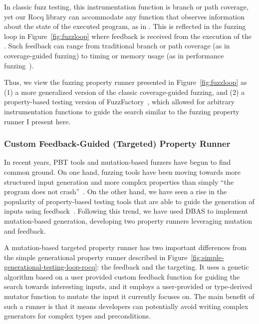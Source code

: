 In classic fuzz testing, this instrumentation function is branch or path coverage, yet
our Rocq library can accommodate any function that observes information about the state
of the executed program, as in \citet{FuzzFactory}. This is reflected in the fuzzing
loop in Figure~\ref{fig:fuzzloop} where feedback is received from the execution of the
. Such feedback can range
from traditional branch or path coverage (as in coverage-guided fuzzing) to timing or
memory usage (as in performance fuzzing~\cite{PerfFuzz}).

Thus, we view the fuzzing property runner presented in Figure~\ref{fig:fuzzloop} as (1)
a more generalized version of the classic coverage-guided fuzzing, and (2) a
property-based testing version of FuzzFactory~\cite{FuzzFactory}, which allowed for
arbitrary instrumentation functions to guide the search similar to the fuzzing property
runner I present here. \label{fig:fuzzloop}

\subsubsection{Custom Feedback-Guided (Targeted) Property Runner}\label{sec:loops:targeted}

In recent years, PBT tools and mutation-based fuzzers have begun to find common ground.
On one hand, fuzzing tools have been moving towards more structured input generation
and more complex properties than simply ``the program does not
crash''~\cite{DBLP:journals/pacmpl/ParkWZS21,DBLP:conf/sigsoft/Sun0JWP023,DBLP:conf/icse/PadhyeLSPT19}.
On the other hand, we have seen a rise in the popularity of property-based testing
tools that are able to guide the generation of inputs using feedback~\cite{TargetedPBT,
  FuzzChick, Zest}. Following this trend, we have used DBAS to implement mutation-based
generation, developing two property runners leveraging mutation and feedback.

A mutation-based targeted property runner has two important differences from the simple
generational property runner described in
Figure~\ref{fig:simple-generational-testing-loop-rocq}: the feedback and the targeting.
It uses a genetic algorithm based on a user provided custom feedback function for
guiding the search towards interesting inputs, and it employs a user-provided or
type-derived mutator function to mutate the input it currently focuses on. The main
benefit of such a runner is that it means developers can potentially avoid writing
complex generators for complex types and preconditions.


